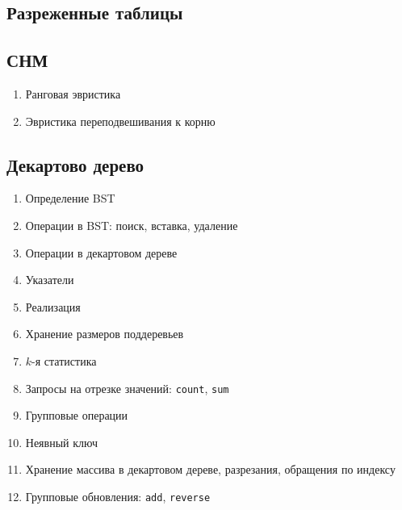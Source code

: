 \documentclass[a4paper,12pt]{article}
\begin{document}
    \subsection{Разреженные таблицы}

    \subsection{СНМ}
      \begin{enumerate}
        \item Ранговая эвристика
        \item Эвристика переподвешивания к корню
      \end{enumerate}

    \subsection{Декартово дерево}
      \begin{enumerate}
        \item Определение BST
        \item Операции в BST: поиск, вставка, удаление
        \item Операции в декартовом дереве
        \item Указатели
        \item Реализация
        \item Хранение размеров поддеревьев
        \item $k$-я статистика
        \item Запросы на отрезке значений: \texttt{count}, \texttt{sum}
        \item Групповые операции
        \item Неявный ключ
        \item Хранение массива в декартовом дереве, разрезания, обращения по индексу
        \item Групповые обновления: \texttt{add}, \texttt{reverse}
      \end{enumerate}
\end{document}
